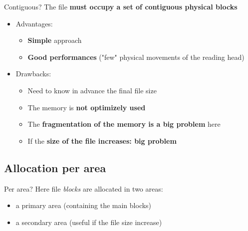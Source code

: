 \documentclass{beamer}[10pt, usepdftitle=false, handout]
\begin{document}
{\begin{frame}
	\begin{block}{Contiguous?}
	The file \textbf{must occupy a set of contiguous physical blocks}
	\end{block}
	\vspace*{1em}	
	\begin{itemize}
	\item{Advantages:
		\begin{itemize}
		\item {\textbf{Simple} approach}
		\item {\textbf{Good performances} ("few" physical movements of the reading head)}
		\end{itemize}			
	}	
	\vspace*{1em}
	\item{Drawbacks:
		\begin{itemize}
		\item{Need to know in advance the final file size}
		\item{The memory is \textbf{not optimizely used}\footnotemark[2]}
		\item{The \textbf{fragmentation of the memory is a big problem} here}
		\item{If the \textbf{size of the file increases: big problem}\footnotemark[3]}		
		\end{itemize}
	}			
	\end{itemize}		
	

	\end{frame}	

	\subsection{Allocation per area}

	\begin{frame}
		
	\begin{block}{Per area?}
	Here file \textit{blocks} are allocated in two areas: 
	\begin{itemize}
	\item{a primary area (containing the main blocks)}
	\item{a secondary area (useful if the file size increase)}
	\end{itemize}
	\end{block}
	
	\vspace*{1em}	
	

\end{frame}}
\end{document}
